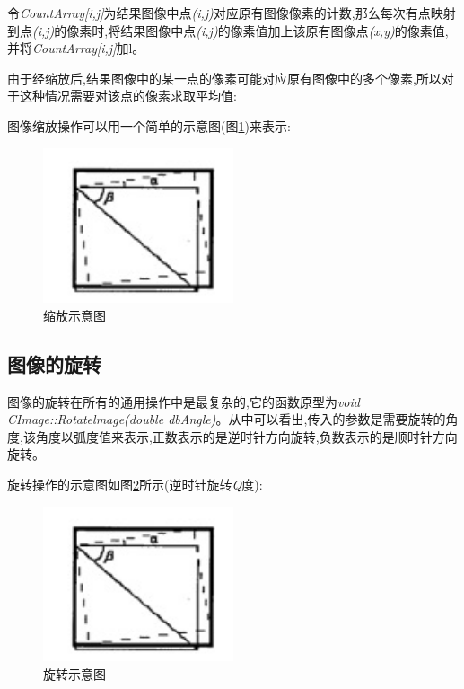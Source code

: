 \documentclass{XDBAthesis}
\begin{document}
    令\emph{CountArray[i,j]}为结果图像中点\emph{(i,j)}对应原有图像像素的计数,那么每次有点映射到点\emph{(i,j)}的像素时,将结果图像中点\emph{(i,j)}的像素值加上该原有图像点\emph{(x,y)}的像素值,并将\emph{CountArray[i,j]}加l。

由于经缩放后,结果图像中的某一点的像素可能对应原有图像中的多个像素,所以对于这种情况需要对该点的像素求取平均值:



    图像缩放操作可以用一个简单的示意图(图\ref{fg:ss})来表示:
    
\begin{figure}[htb]
    \centering
    \includegraphics[width=0.5\textwidth]{figure/roat}
    \caption{缩放示意图}
    \label{fg:ss}
\end{figure}

\subsection{图像的旋转}

    图像的旋转在所有的通用操作中是最复杂的,它的函数原型为\emph{void CImage::Rotatelmage(double dbAngle)}。从中可以看出,传入的参数是需要旋转的角度,该角度以弧度值来表示,正数表示的是逆时针方向旋转,负数表示的是顺时针方向旋转。

旋转操作的示意图如图\ref{fg:roat}所示(逆时针旋转\emph{Q}度):
\begin{figure}[htb]
    \centering
    \includegraphics[width=0.5\textwidth]{figure/roat}
    \caption{旋转示意图}
    \label{fg:roat}
\end{figure}
      
\end{document}
